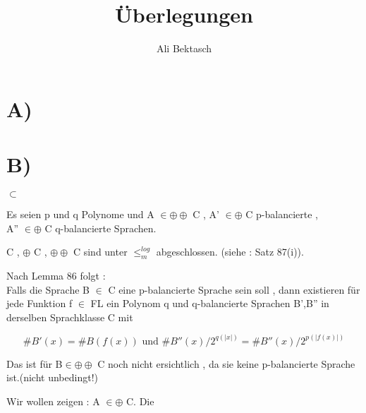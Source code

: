 \documentclass{article}
\title{Überlegungen}
\author{Ali Bektasch}
\begin{document}
	\maketitle
	\section*{A)}
	\section*{B)}
		\begin{center}
		$\subset$
		\end{center}
		\begin{legal}
			\item Es seien p und q Polynome und  A $\in \oplus \oplus$ C ,  A' $\in \oplus$ C p-balancierte , \\
			 A'' $\in \oplus$ C q-balancierte Sprachen.
			\item C , $\oplus$ C , $\oplus \oplus$ C sind unter $\leq^{log}_m$ abgeschlossen. (siehe : Satz 87(i)).
			
			\begin{legal}
				\item Nach Lemma 86 folgt : \\
				Falls die Sprache B $\in$ C eine p-balancierte Sprache sein soll , dann existieren für jede Funktion f $\in $ FL ein Polynom q und q-balancierte Sprachen B',B'' in derselben Sprachklasse C mit

				\[
					\#B'(x) = \#B(f(x))  \text{ und } \#B''(x)/2^{q(|x|)} = \#B''(x)/2^{p(|f(x)|)}
				\]

				\begin{legal}
					\item Das ist für B$ \in \oplus \oplus $ C noch nicht ersichtlich , da sie keine p-balancierte Sprache ist.(nicht unbedingt!)
				\end{legal}
			\end{legal}

			\item Wir wollen zeigen : A $\in \oplus$ C. Die 

			\begin{legal}

			\end{legal}

		\end{legal}
	
\end{document}
